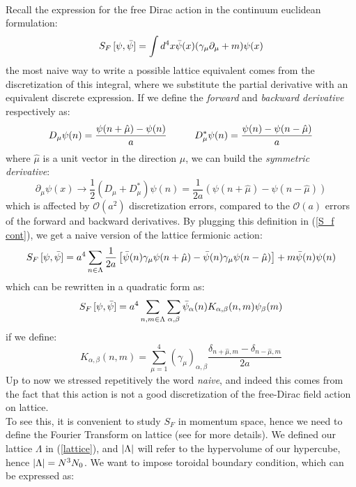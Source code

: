 \\ Recall the expression for the free Dirac action in the continuum euclidean formulation:
\begin{equation}\label{S_f cont}
    S_F \, [\psi, \Bar{\psi}] = \int d^4x \Bar{\psi}(x) (\gamma_\mu \partial_\mu + m) \psi(x)
\end{equation}
the most naive way to write a possible lattice equivalent comes from the discretization of this integral, where we substitute the partial derivative with an equivalent discrete expression. If we define the \textit{forward} and \textit{backward derivative} respectively as:
\begin{equation}
    D_\mu \psi(n) = \frac{\psi(n + \hat{\mu}) - \psi(n)}{a} \hspace{10mm} D^*_\mu \psi(n) = \frac{\psi(n) - \psi(n - \hat{\mu})}{a}
\end{equation}
where $\hat{\mu}$ is a unit vector in the direction $\mu$, we can build the \textit{symmetric derivative}:
\begin{equation}
    \partial_\mu \psi(x) \to \frac{1}{2} \left( D_\mu + D_\mu^*\right)\psi(n) = \frac{1}{2a}\left(\psi(n + \hat{\mu}) - \psi(n - \hat{\mu}) \right)
\end{equation}
which is affected by $\mathcal{O}(a^2)$ discretization errors, compared to the $\mathcal{O}(a)$ errors of the forward and backward derivatives. By plugging this definition in (\ref{S_f cont}), we get a naive version of the lattice fermionic action:
\begin{equation}
    S_F\,[\psi, \Bar{\psi}] = a^4 \sum_{n \in \Lambda} \frac{1}{2a}\left[ \Bar{\psi}(n) \gamma_\mu \psi(n + \hat{\mu}) - \Bar{\psi}(n) \gamma_\mu \psi(n - \hat{\mu})  \right] + m \Bar{\psi}(n) \psi(n)
\end{equation}
which can be rewritten in a quadratic form as:
\begin{equation}\label{S naive}
     S_F\,[\psi, \Bar{\psi}] = a^4 \sum_{n, m \in \Lambda} \sum_{\alpha, \beta} \Bar{\psi}_{\alpha}(n) K_{\alpha, \beta}(n, m) \psi_\beta(m)
\end{equation}
if we define:
\begin{equation}\label{K}
    K_{\alpha, \beta}(n, m) = \sum_{\mu = 1}^4 \left( \gamma_\mu \right)_{\alpha, \beta} \frac{\delta_{n + \hat{\mu}, m} - \delta_{n - \hat{\mu},m} }{2a}
\end{equation}
Up to now we stressed repetitively the word \textit{naive}, and indeed this comes from the fact that this action is not a good discretization of the free-Dirac field action on lattice. \\ To see this, it is convenient to study $S_F$ in momentum space, hence we need to define the Fourier Transform on lattice (see \cite{Gattringer:2010zz} for more details). We defined our lattice $\Lambda$ in (\ref{lattice}), and $\abs{\Lambda}$ will refer to the hypervolume of our hypercube, hence $\abs{\Lambda} = N^3 N_0$. We want to impose toroidal boundary condition, which can be expressed as:
